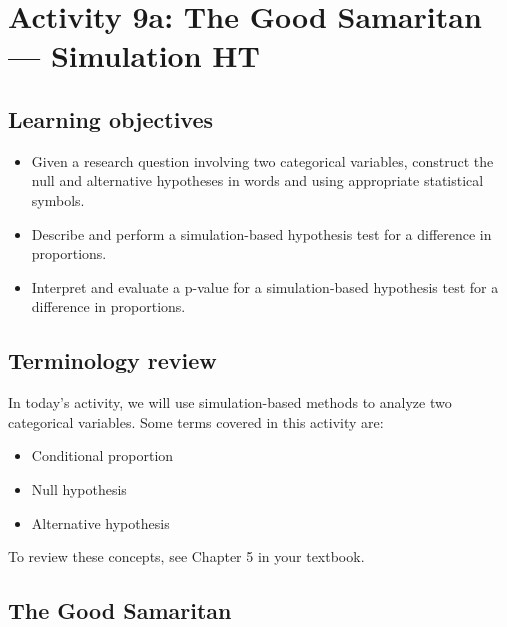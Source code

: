 \documentclass[
]{report}
\begin{document}
\newpage

\hypertarget{activity-9a-the-good-samaritan-simulation-ht}{%
\section{Activity 9a: The Good Samaritan --- Simulation HT}\label{activity-9a-the-good-samaritan-simulation-ht}}


\hypertarget{learning-objectives-12}{%
\subsection{Learning objectives}\label{learning-objectives-12}}

\begin{itemize}
\item
  Given a research question involving two categorical variables, construct the null and alternative hypotheses
  in words and using appropriate statistical symbols.
\item
  Describe and perform a simulation-based hypothesis test for a difference in proportions.
\item
  Interpret and evaluate a p-value for a simulation-based hypothesis test for a difference in proportions.
\end{itemize}

\hypertarget{terminology-review-15}{%
\subsection{Terminology review}\label{terminology-review-15}}

In today's activity, we will use simulation-based methods to analyze two categorical variables. Some terms covered in this activity are:

\begin{itemize}
\item
  Conditional proportion
\item
  Null hypothesis
\item
  Alternative hypothesis
\end{itemize}

To review these concepts, see Chapter 5 in your textbook.

\hypertarget{the-good-samaritan}{%
\subsection{The Good Samaritan}\label{the-good-samaritan}}
\end{document}
